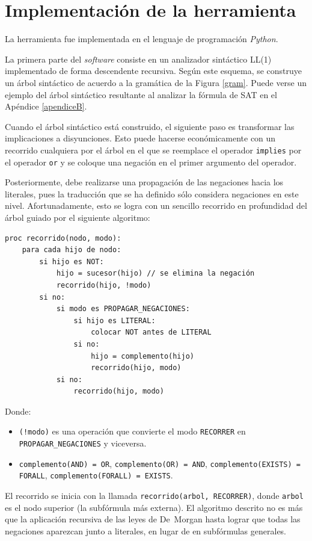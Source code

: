 \section{Implementación de la herramienta}
La herramienta fue implementada en el lenguaje de programación \textit{Python}.

La primera parte del \textit{software} consiste en un analizador sintáctico LL(1) implementado
de forma descendente recursiva. Según este esquema, se construye un árbol
sintáctico de acuerdo a la gramática de la Figura \ref{gram}. Puede verse
un ejemplo del árbol sintáctico resultante al analizar la fórmula de SAT en el
Apéndice \ref{apendiceB}.

Cuando el árbol sintáctico está construido, el siguiente paso es transformar
las implicaciones a disyunciones. Esto puede hacerse económicamente con un
recorrido cualquiera por el árbol en el que se reemplace el operador
\texttt{implies} por el operador \texttt{or} y se coloque una negación en el
primer argumento del operador.

Posteriormente, debe realizarse una propagación de las negaciones hacia los
literales, pues la traducción que se ha definido sólo considera negaciones en
este nivel. Afortunadamente, esto se logra con un sencillo recorrido en
profundidad del árbol guiado por el siguiente algoritmo:

\begin{center}
\begin{verbatim}
proc recorrido(nodo, modo):
    para cada hijo de nodo:
        si hijo es NOT:
            hijo = sucesor(hijo) // se elimina la negación
            recorrido(hijo, !modo)
        si no:
            si modo es PROPAGAR_NEGACIONES:
                si hijo es LITERAL:
                    colocar NOT antes de LITERAL
                si no:
                    hijo = complemento(hijo)
                    recorrido(hijo, modo)
            si no:
                recorrido(hijo, modo)
\end{verbatim}
\end{center}
Donde:
\begin{itemize}
\item \texttt{(!modo)} es una operación que convierte el modo
\texttt{RECORRER} en \texttt{PROPAGAR\_NEGACIONES} y viceversa.
\item \texttt{complemento(AND) = OR}, \texttt{complemento(OR) = AND},
\texttt{complemento(EXISTS) = FORALL}, \texttt{complemento(FORALL) = EXISTS}.
\end{itemize}
El recorrido se inicia con la llamada \texttt{recorrido(arbol, RECORRER)},
donde \texttt{arbol} es el nodo superior (la subfórmula más externa).
El algoritmo descrito no es más que la aplicación recursiva de las leyes de De~Morgan
hasta lograr que todas las negaciones aparezcan junto a literales, en lugar de
en subfórmulas generales.

